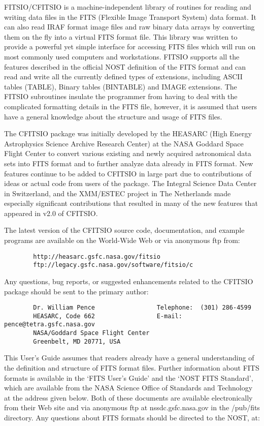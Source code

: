 \documentclass[11pt]{book}
\begin{document}
FITSIO/CFITSIO is a machine-independent library of routines for reading
and writing data files in the FITS (Flexible Image Transport System)
data format.  It can also read IRAF format image files and raw binary
data arrays by converting them on the fly into a virtual FITS format
file.  This library was written to provide a powerful yet simple
interface for accessing FITS files which will run on most commonly used
computers and workstations. FITSIO supports all the features described
in the official NOST definition of the FITS format and can read and
write all the currently defined types of extensions, including ASCII
tables (TABLE), Binary tables (BINTABLE) and IMAGE extensions. The
FITSIO subroutines insulate the programmer from having to deal with the
complicated formatting details in the FITS file, however, it is assumed
that users have a general knowledge about the structure and usage of
FITS files.

The CFITSIO package was initially developed by the HEASARC (High Energy
Astrophysics Science Archive Research Center) at the NASA Goddard Space
Flight Center to convert various existing and newly acquired
astronomical data sets into FITS format and to further analyze data
already in FITS format.  New features continue to be added to CFITSIO
in large part due to contributions of ideas or actual code from users
of the package.  The Integral Science Data Center in Switzerland, and
the XMM/ESTEC project in The Netherlands made especially significant
contributions that resulted in many of the new features that appeared
in v2.0 of CFITSIO.

The latest version of the CFITSIO source code, documentation, and
example programs are available on the World-Wide Web or via anonymous
ftp from:

\begin{verbatim}
        http://heasarc.gsfc.nasa.gov/fitsio
        ftp://legacy.gsfc.nasa.gov/software/fitsio/c
\end{verbatim}
\newpage
Any questions, bug reports, or suggested enhancements related to the CFITSIO
package should be sent to the primary author:

\begin{verbatim}
        Dr. William Pence                 Telephone:  (301) 286-4599
        HEASARC, Code 662                 E-mail: pence@tetra.gsfc.nasa.gov
        NASA/Goddard Space Flight Center
        Greenbelt, MD 20771, USA
\end{verbatim}
This User's Guide assumes that readers already have a general
understanding of the definition and structure of FITS format files.
Further information about FITS formats is available in the `FITS User's
Guide' and the `NOST FITS Standard', which are available from the NASA
Science Office of Standards and Technology at the address given below.
Both of these documents are available electronically from their Web
site and via anonymous ftp at nssdc.gsfc.nasa.gov in the /pub/fits
directory. Any questions about FITS formats should be directed to the
NOST, at:
\end{document}
